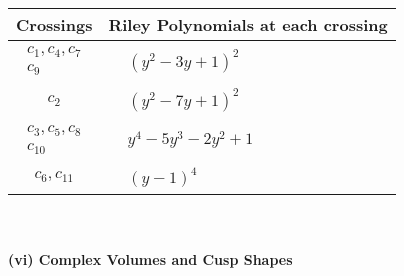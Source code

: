 \documentclass[1p]{elsarticle_modified}
\theoremstyle{definition}
\begin{document}
\begin{tabular}{m{50pt}|m{274pt}}
Crossings & \hspace{64pt}Riley Polynomials at each crossing \\
\hline $$\begin{aligned}c_{1},c_{4},c_{7}\\c_{9}\end{aligned}$$&$\begin{aligned}
&(y^2-3 y+1)^2
\end{aligned}$\\
\hline $$\begin{aligned}c_{2}\end{aligned}$$&$\begin{aligned}
&(y^2-7 y+1)^2
\end{aligned}$\\
\hline $$\begin{aligned}c_{3},c_{5},c_{8}\\c_{10}\end{aligned}$$&$\begin{aligned}
&y^4-5 y^3-2 y^2+1
\end{aligned}$\\
\hline $$\begin{aligned}c_{6},c_{11}\end{aligned}$$&$\begin{aligned}
&(y-1)^4
\end{aligned}$\\
\hline
\end{tabular}\\~\\
\newpage\flushleft \textbf{(vi) Complex Volumes and Cusp Shapes}
\end{document}

